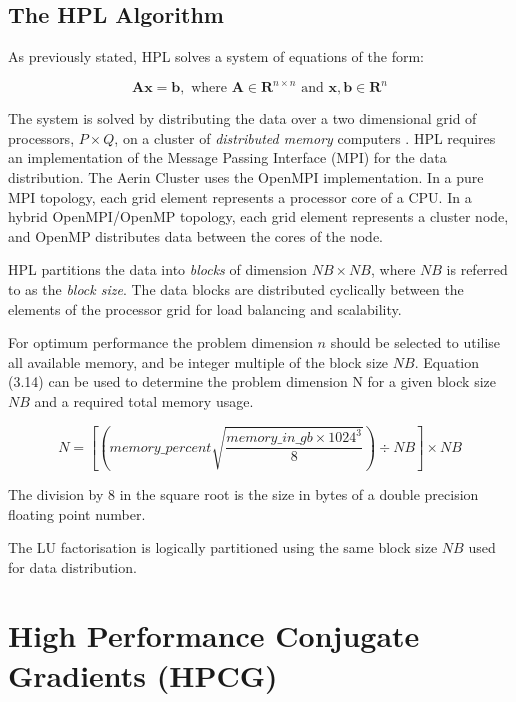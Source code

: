%
%
\subsection{The HPL Algorithm}

As previously stated, HPL solves a system of equations of the form:

\begin{equation}
\mathbf{Ax} = \mathbf{b},\text{ where }\mathbf{A} \in \mathbf{R}^{n\times n}\text{ and }\mathbf{x}, \mathbf{b} \in \mathbf{R}^n
\end{equation} 

The system is solved by distributing the data over a two dimensional grid of processors, $P \times Q$, on a cluster of \emph{distributed memory} computers \cite{linpack-ppf}. HPL requires an implementation of the Message Passing Interface (MPI) for the data distribution. The Aerin Cluster uses the OpenMPI implementation. In a pure MPI topology, each grid element represents a processor core of a CPU. In a hybrid OpenMPI/OpenMP topology, each grid element represents a cluster node, and OpenMP distributes data between the cores of the node.   

HPL partitions the data into \emph{blocks} of dimension $NB \times NB$, where $NB$ is referred to as the \emph{block size}. The data blocks are distributed cyclically between the elements of the processor grid for load balancing and scalability. 

For optimum performance the problem dimension $n$ should be selected to utilise all available memory, and be integer multiple of the block size $NB$. Equation (3.14) can be used to determine the problem dimension N for a given block size $NB$ and a required total memory usage.

\begin{equation}
N = \left[\left(memory\_percent \sqrt{\frac{memory\_in\_gb \times 1024^3}{8}}\right) \div NB\right] \times NB
\end{equation}

The division by 8 in the square root is the size in bytes of a double precision floating point number.

The LU factorisation is logically partitioned using the same block size $NB$ used for data distribution.


%
%
\section{High Performance Conjugate Gradients (HPCG)}

